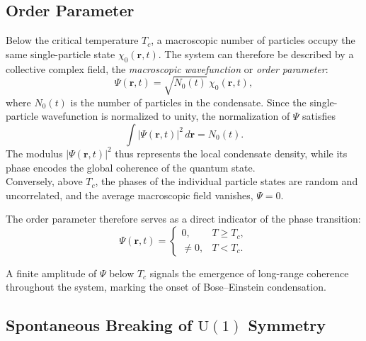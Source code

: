 \subsection*{Order Parameter}  
Below the critical temperature \(T_c\), a macroscopic number of particles occupy the same single-particle state \(\chi_0(\mathbf{r},t)\).  
The system can therefore be described by a collective complex field, the \textit{macroscopic wavefunction} or \textit{order parameter}:
\[
    \Psi(\mathbf{r},t) = \sqrt{N_0(t)}\, \chi_0(\mathbf{r},t),
\]
where \(N_0(t)\) is the number of particles in the condensate.  
Since the single-particle wavefunction is normalized to unity, the normalization of \(\Psi\) satisfies
\[
    \int |\Psi(\mathbf{r},t)|^2\, d\mathbf{r} = N_0(t).
\]
The modulus \(|\Psi(\mathbf{r},t)|^2\) thus represents the local condensate density, while its phase encodes the global coherence of the quantum state.  \\
Conversely, above $T_c$, the phases of the individual particle states are random and uncorrelated, and the average macroscopic field vanishes, \(\Psi = 0\).

The order parameter therefore serves as a direct indicator of the phase transition:
\[
    \Psi(\mathbf{r},t) =
    \begin{cases}
        0, & T \geq T_c,\\[4pt]
        \neq 0, & T < T_c.
    \end{cases}
\]

A finite amplitude of $\Psi$ below $T_c$ signals the emergence of long-range coherence throughout the system, marking the onset of Bose–Einstein condensation.

\subsection*{Spontaneous Breaking of \texorpdfstring{$\mathrm{U}(1)$}{U(1)} Symmetry}

